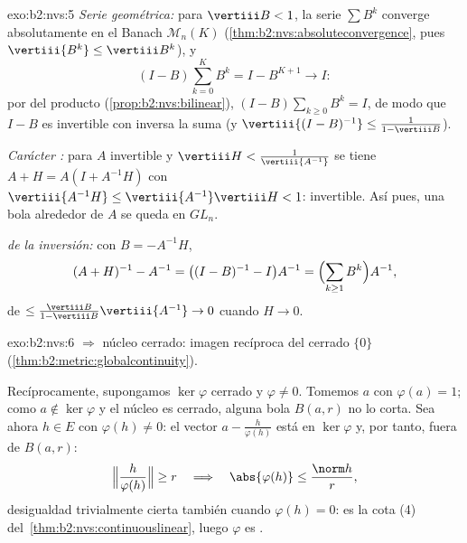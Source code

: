 \begin{solution}{exo:b2:nvs:5}
\emph{Serie geométrica:} para $\vertiii B < 1$, la serie $\sum B^k$
converge absolutamente en el Banach $\mathcal{M}_n(K)$
(\cref{thm:b2:nvs:absoluteconvergence}, pues $\vertiii{B^k} \leq
\vertiii B^k$), y
\[
(I - B)\sum_{k=0}^{K} B^k = I - B^{K+1} \longrightarrow I :
\]
por  del producto (\cref{prop:b2:nvs:bilinear}), $(I -
B)\sum_{k\geq0} B^k = I$, de modo que $I - B$ es invertible con
inversa la suma (y $\vertiii{(I-B)^{-1}} \leq \frac{1}{1 - \vertiii
B}$).

\emph{Carácter :} para $A$ invertible y $\vertiii H <
\frac{1}{\vertiii{A^{-1}}}$ se tiene $A + H = A(I + A^{-1}H)$ con
$\vertiii{A^{-1}H} \leq \vertiii{A^{-1}}\vertiii H < 1$: invertible.
Así pues, una bola alrededor de $A$ se queda en $GL_n$.

\emph{ de la inversión:} con $B = -A^{-1}H$,
\[
(A + H)^{-1} - A^{-1} = \bigl((I - B)^{-1} - I\bigr)A^{-1}
= \Bigl(\sum_{k \geq 1} B^k\Bigr) A^{-1},
\]
de  $\leq \frac{\vertiii B}{1 - \vertiii B}\vertiii{A^{-1}}
\to 0$ cuando $H \to 0$.
\end{solution}

\begin{solution}{exo:b2:nvs:6}
 $\Rightarrow$ núcleo cerrado: imagen recíproca del cerrado
$\{0\}$ (\cref{thm:b2:metric:globalcontinuity}).

Recíprocamente, supongamos $\ker\varphi$ cerrado y $\varphi \neq 0$.
Tomemos $a$ con $\varphi(a) = 1$; como $a \notin \ker\varphi$ y el
núcleo es cerrado, alguna bola $B(a, r)$ no lo corta. Sea ahora $h
\in E$ con $\varphi(h) \neq 0$: el vector $a -
\frac{h}{\varphi(h)}$ está en $\ker\varphi$ y, por tanto, fuera de
$B(a, r)$:
\[
\Bigl\Vert \frac{h}{\varphi(h)} \Bigr\Vert \geq r
\quad\Longrightarrow\quad
\abs{\varphi(h)} \leq \frac{\norm h}{r},
\]
desigualdad trivialmente cierta también cuando $\varphi(h) = 0$: es
la cota (4) del~\cref{thm:b2:nvs:continuouslinear}, luego $\varphi$
es .
\end{solution}

